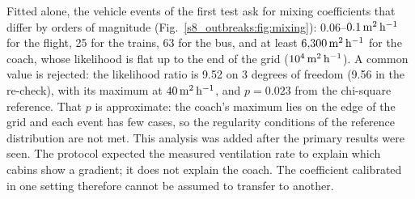 Fitted alone, the vehicle events of the first test ask for mixing coefficients that differ by orders of magnitude
(Fig.~\ref{s8_outbreaks:fig:mixing}): 0.06--$0.1\,\mathrm{m}^2\,\mathrm{h}^{-1}$ for the flight, 25 for the trains, 63 for the bus, and
at least $6{,}300\,\mathrm{m}^2\,\mathrm{h}^{-1}$ for the coach, whose likelihood is flat up to the end of the grid ($10^4\,\mathrm{m}^2\,\mathrm{h}^{-1}$). A
common value is rejected: the likelihood ratio is 9.52 on 3 degrees of freedom (9.56 in the re-check), with
its maximum at $40\,\mathrm{m}^2\,\mathrm{h}^{-1}$, and $p=0.023$ from the chi-square reference. That $p$ is approximate: the coach's
maximum lies on the edge of the grid and each event has few cases, so the regularity conditions of the
reference distribution are not met. This analysis was added after the
primary results were seen. The protocol expected the measured ventilation rate to explain which cabins show a
gradient; it does not explain the coach. The coefficient calibrated in one setting therefore cannot be assumed
to transfer to another.

